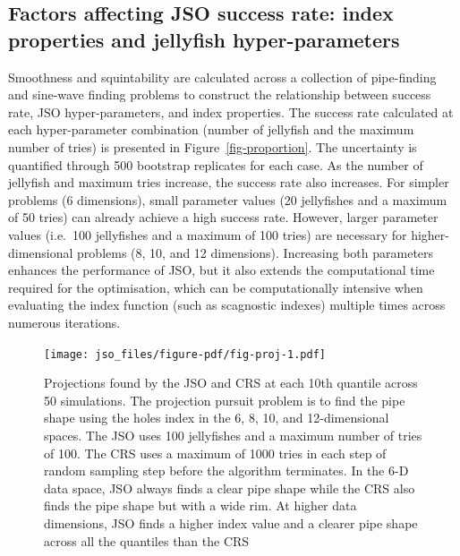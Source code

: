 \documentclass[
  12pt,
]{interact}
\theoremstyle{plain}
\begin{document}
\hypertarget{factors-affecting-jso-success-rate-index-properties-and-jellyfish-hyper-parameters}{%
\subsection{Factors affecting JSO success rate: index properties and
jellyfish
hyper-parameters}\label{factors-affecting-jso-success-rate-index-properties-and-jellyfish-hyper-parameters}}

Smoothness and squintability are calculated across a collection of
pipe-finding and sine-wave finding problems to construct the
relationship between success rate, JSO hyper-parameters, and index
properties. The success rate calculated at each hyper-parameter
combination (number of jellyfish and the maximum number of tries) is
presented in Figure~\ref{fig-proportion}. The uncertainty is quantified
through 500 bootstrap replicates for each case. As the number of
jellyfish and maximum tries increase, the success rate also increases.
For simpler problems (6 dimensions), small parameter values (20
jellyfishes and a maximum of 50 tries) can already achieve a high
success rate. However, larger parameter values (i.e.~100 jellyfishes and
a maximum of 100 tries) are necessary for higher-dimensional problems
(8, 10, and 12 dimensions). Increasing both parameters enhances the
performance of JSO, but it also extends the computational time required
for the optimisation, which can be computationally intensive when
evaluating the index function (such as scagnostic indexes) multiple
times across numerous iterations.

\begin{figure}

{\centering \texttt{[image: jso\_files/figure-pdf/fig-proj-1.pdf]}

}

\caption{\label{fig-proj}Projections found by the JSO and CRS at each
10th quantile across 50 simulations. The projection pursuit problem is
to find the pipe shape using the holes index in the 6, 8, 10, and
12-dimensional spaces. The JSO uses 100 jellyfishes and a maximum number
of tries of 100. The CRS uses a maximum of 1000 tries in each step of
random sampling step before the algorithm terminates. In the 6-D data
space, JSO always finds a clear pipe shape while the CRS also finds the
pipe shape but with a wide rim. At higher data dimensions, JSO finds a
higher index value and a clearer pipe shape across all the quantiles
than the CRS}

\end{figure}
\end{document}
